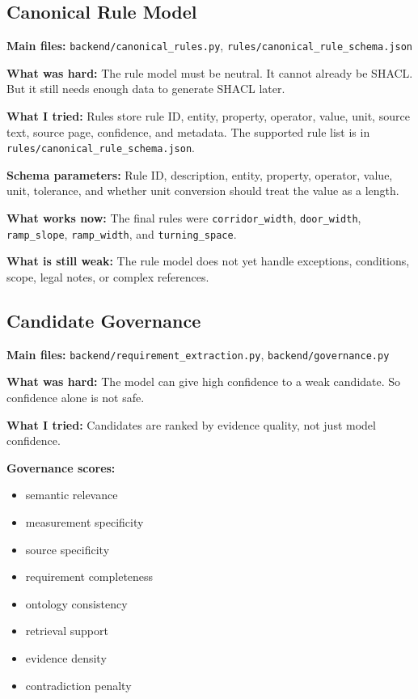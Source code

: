 \documentclass[11pt,a4paper]{article}
\begin{document}
\subsection{Canonical Rule Model}
\textbf{Main files:} \texttt{backend/canonical\_rules.py}, \texttt{rules/canonical\_rule\_schema.json}

\textbf{What was hard:}
The rule model must be neutral. It cannot already be SHACL. But it still needs enough data to generate SHACL later.

\textbf{What I tried:}
Rules store rule ID, entity, property, operator, value, unit, source text, source page, confidence, and metadata. The supported rule list is in \texttt{rules/canonical\_rule\_schema.json}.

\textbf{Schema parameters:}
Rule ID, description, entity, property, operator, value, unit, tolerance, and whether unit conversion should treat the value as a length.

\textbf{What works now:}
The final rules were \texttt{corridor\_width}, \texttt{door\_width}, \texttt{ramp\_slope}, \texttt{ramp\_width}, and \texttt{turning\_space}.

\textbf{What is still weak:}
The rule model does not yet handle exceptions, conditions, scope, legal notes, or complex references.

\subsection{Candidate Governance}
\textbf{Main files:} \texttt{backend/requirement\_extraction.py}, \texttt{backend/governance.py}

\textbf{What was hard:}
The model can give high confidence to a weak candidate. So confidence alone is not safe.

\textbf{What I tried:}
Candidates are ranked by evidence quality, not just model confidence.

\textbf{Governance scores:}
\begin{itemize}
  \item semantic relevance
  \item measurement specificity
  \item source specificity
  \item requirement completeness
  \item ontology consistency
  \item retrieval support
  \item evidence density
  \item contradiction penalty
\end{itemize}
\end{document}
